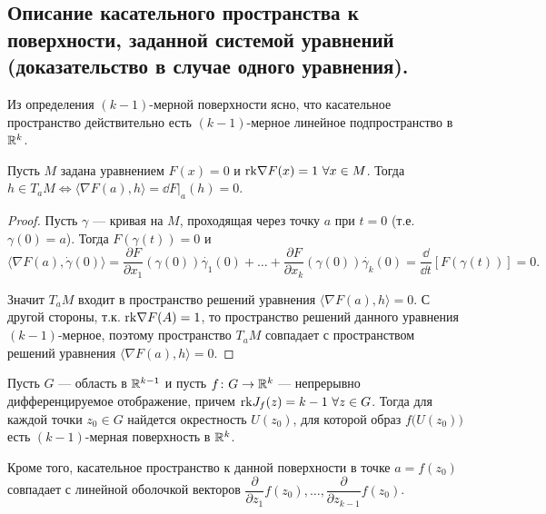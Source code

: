 \documentclass[a4paper]{article}
\theoremstyle{named}
\begin{document}
    \subsection{Описание касательного пространства к поверхности, заданной системой уравнений (доказательство в случае одного уравнения).}
    
    Из определения $(k-1)$-мерной поверхности ясно, что касательное пространство действительно есть $(k-1)$-мерное линейное подпространство в $\mathbb{R}^k$.
    
    \begin{proposal*}
        Пусть $M$ задана уравнением	$F (x) = 0$ и ${\rm rk}\nabla F(x) = 1\ \forall x \in M$. 
        Тогда $h \in T_aM \Leftrightarrow \langle \nabla F(a), h \rangle = \dd F\bigl|_a(h)=0$.
    \end{proposal*}
    
    \begin{proof}
        Пусть $\gamma$ --- кривая на $M$, проходящая через точку $a$ при $t=0$ (т.е. $\gamma(0) = a$).
        Тогда $F(\gamma(t))=0$ и
        $$
            \langle\nabla F(a), \dot{\gamma}(0)\rangle=
            \dfrac{\partial F}{\partial x_1}(\gamma(0))\dot{\gamma_1}(0)
            +\ldots+
            \dfrac{\partial F}{\partial x_k}(\gamma(0))\dot{\gamma_k}(0)=
            \dfrac{\dd}{\dd t}[F(\gamma(t))]=0.
        $$
    
        Значит $T_aM$ входит в пространство решений уравнения $\langle\nabla F(a),h\rangle=0$.
        С другой стороны, т.к. ${\rm rk}\nabla F(A)=1$,	то пространство решений данного уравнения $(k-1)$-мерное, поэтому пространство $T_aM$ совпадает с пространством решений уравнения $\langle\nabla F(a),h\rangle=0$.
    \end{proof}
    
    \begin{proposal*}
        Пусть $G$ --- область в $\mathbb{R}^{k-1}$	и пусть $f\colon G\to \mathbb{R}^k$ --- непрерывно дифференцируемое отображение,
        причем ${\rm rk}J_f(z) = k-1\ \forall z\in G$.
        Тогда для каждой точки $z_0\in G$ найдется окрестность $U(z_0)$, для которой образ $f\bigl(U(z_0)\bigr)$ есть $(k-1)$-мерная поверхность в $\mathbb{R}^k$.
    
        Кроме того, касательное пространство к данной поверхности в точке $a=f(z_0)$ совпадает с линейной оболочкой векторов $\dfrac{\partial}{\partial z_1}f(z_0),\ldots, \dfrac{\partial}{\partial z_{k-1}}f(z_0)$.
    \end{proposal*}
    
\end{document}
